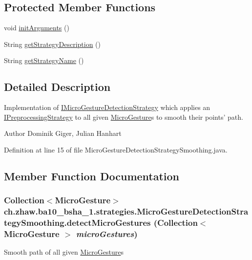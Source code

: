 \subsection*{Protected Member Functions}
\begin{DoxyCompactItemize}
\item 
void \hyperlink{classch_1_1zhaw_1_1ba10__bsha__1_1_1strategies_1_1MicroGestureDetectionStrategySmoothing_ab400617238497ed677884eb5bb7b5782}{initArguments} ()
\item 
String \hyperlink{classch_1_1zhaw_1_1ba10__bsha__1_1_1strategies_1_1MicroGestureDetectionStrategySmoothing_a5189e1b6d591f58bbe190f59cd6ad18f}{getStrategyDescription} ()
\item 
String \hyperlink{classch_1_1zhaw_1_1ba10__bsha__1_1_1strategies_1_1MicroGestureDetectionStrategySmoothing_aa12378131b9c311f0191934885c3345a}{getStrategyName} ()
\end{DoxyCompactItemize}


\subsection{Detailed Description}
Implementation of \hyperlink{interfacech_1_1zhaw_1_1ba10__bsha__1_1_1strategies_1_1IMicroGestureDetectionStrategy}{IMicroGestureDetectionStrategy} which applies an \hyperlink{interfacech_1_1zhaw_1_1ba10__bsha__1_1_1strategies_1_1IPreprocessingStrategy}{IPreprocessingStrategy} to all given \hyperlink{}{MicroGesture}s to smooth their points' path.

\begin{DoxyAuthor}{Author}
Dominik Giger, Julian Hanhart 
\end{DoxyAuthor}


Definition at line 15 of file MicroGestureDetectionStrategySmoothing.java.

\subsection{Member Function Documentation}
\hypertarget{classch_1_1zhaw_1_1ba10__bsha__1_1_1strategies_1_1MicroGestureDetectionStrategySmoothing_acdb5b6b2bb7ad9f48c79b88770113f45}{
\subsubsection[{detectMicroGestures}]{\setlength{\rightskip}{0pt plus 5cm}Collection$<${\bf MicroGesture}$>$ ch.zhaw.ba10\_\-bsha\_\-1.strategies.MicroGestureDetectionStrategySmoothing.detectMicroGestures (Collection$<$ {\bf MicroGesture} $>$ {\em microGestures})}}
\label{classch_1_1zhaw_1_1ba10__bsha__1_1_1strategies_1_1MicroGestureDetectionStrategySmoothing_acdb5b6b2bb7ad9f48c79b88770113f45}
Smooth path of all given \hyperlink{}{MicroGesture}s


